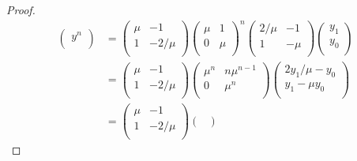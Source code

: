 \documentclass[../psets.tex]{subfiles}
\begin{document}
\begin{enumerate}
\begin{enumerate}
\begin{proof}
\begin{align*}
\begin{pmatrix}
                    y^n\\
                \end{pmatrix}
                &=
                \begin{pmatrix}
                    \mu & -1\\
                    1 & -2/\mu\\
                \end{pmatrix}
                \begin{pmatrix}
                    \mu & 1\\
                    0 & \mu\\
                \end{pmatrix}^n
                \begin{pmatrix}
                    2/\mu & -1\\
                    1 & -\mu\\
                \end{pmatrix}
                \begin{pmatrix}
                    y_1\\
                    y_0\\
                \end{pmatrix}\\
                &=
                \begin{pmatrix}
                    \mu & -1\\
                    1 & -2/\mu\\
                \end{pmatrix}
                \begin{pmatrix}
                    \mu^n & n\mu^{n-1}\\
                    0 & \mu^n\\
                \end{pmatrix}
                \begin{pmatrix}
                    2y_1/\mu-y_0\\
                    y_1-\mu y_0\\
                \end{pmatrix}\\
                &=
                \begin{pmatrix}
                    \mu & -1\\
                    1 & -2/\mu\\
                \end{pmatrix}
                \begin{pmatrix}

\end{pmatrix}
\end{align*}
\end{proof}
\end{enumerate}
\end{enumerate}
\end{document}
